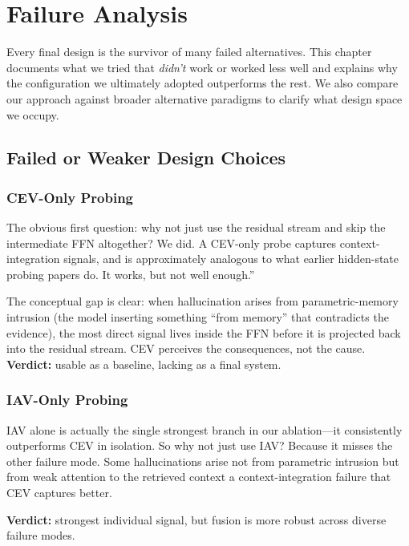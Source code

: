 \chapter{Failure Analysis}
\label{ch:failure_analysis}

Every final design is the survivor of many failed alternatives. This chapter documents what we tried that \emph{didn't} work or worked less well and explains why the configuration we ultimately adopted outperforms the rest. We also compare our approach against broader alternative paradigms to clarify what design space we occupy.

\section{Failed or Weaker Design Choices}
\label{sec:failed_choices}

\subsection{CEV-Only Probing}

The obvious first question: why not just use the residual stream and skip the intermediate FFN altogether? We did. A CEV-only probe captures context-integration signals, and is approximately analogous to what earlier hidden-state probing papers do. It works, but not well enough.”

The conceptual gap is clear: when hallucination arises from parametric-memory intrusion (the model inserting something ``from memory'' that contradicts the evidence), the most direct signal lives inside the FFN before it is projected back into the residual stream. CEV perceives the consequences, not the cause.\\ \textbf{Verdict:} usable as a baseline, lacking as a final system.

\subsection{IAV-Only Probing}

IAV alone is actually the single strongest branch in our ablation—it consistently outperforms CEV in isolation. So why not just use IAV? Because it misses the other failure mode. Some hallucinations arise not from parametric intrusion but from weak attention to the retrieved context a context-integration failure that CEV captures better.

\textbf{Verdict:} strongest individual signal, but fusion is more robust across diverse failure modes.

